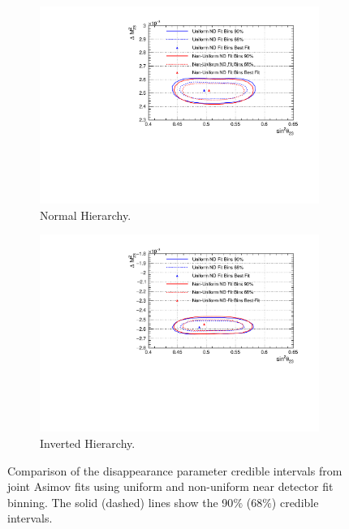 \begin{figure}[!htbp]
\centering
\begin{subfigure}{.7\textwidth}
  \centering
  \includegraphics[width=0.95\linewidth]{figs/compMaCh3Contours_TH2DvsTHPoly_asimov/compMaCh3Contours_TH2DvsTHPoly_disapp_asimovA_NH}
  \caption{Normal Hierarchy.}
  \label{fig:TH2DPolyDisNH}
\end{subfigure}
\begin{subfigure}{.7\textwidth}
  \centering
  \includegraphics[width=0.95\linewidth]{figs/compMaCh3Contours_TH2DvsTHPoly_asimov/compMaCh3Contours_TH2DvsTHPoly_disapp_asimovA_IH}
  \caption{Inverted Hierarchy.}
  \label{fig:TH2DPolyDisIH}
\end{subfigure}
\caption{Comparison of the disappearance parameter credible intervals from joint Asimov fits using uniform and non-uniform near detector fit binning. The solid (dashed) lines show the 90$\%$ ($68\%$) credible intervals.}
\label{fig:TH2DPolyDis}
\end{figure}

